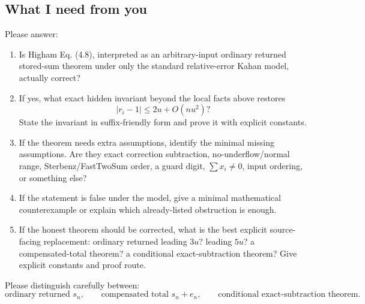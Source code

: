 \documentclass{article}
\begin{document}
\subsection*{What I need from you}

Please answer:

\begin{enumerate}
\item Is Higham Eq. (4.8), interpreted as an arbitrary-input ordinary returned
      stored-sum theorem under only the standard relative-error Kahan model,
      actually correct?
\item If yes, what exact hidden invariant beyond the local facts above restores
      \[
        |r_i-1|\le 2u+O(nu^2)?
      \]
      State the invariant in suffix-friendly form and prove it with explicit
      constants.
\item If the theorem needs extra assumptions, identify the minimal missing
      assumptions.  Are they exact correction subtraction, no-underflow/normal
      range, Sterbenz/FastTwoSum order, a guard digit, \(\sum x_i\neq0\), input
      ordering, or something else?
\item If the statement is false under the model, give a minimal mathematical
      counterexample or explain which already-listed obstruction is enough.
\item If the honest theorem should be corrected, what is the best explicit
      source-facing replacement: ordinary returned leading \(3u\)? leading
      \(5u\)? a compensated-total theorem? a conditional exact-subtraction
      theorem? Give explicit constants and proof route.
\end{enumerate}

Please distinguish carefully between:
\[
\text{ordinary returned }s_n,\qquad
\text{compensated total }s_n+e_n,\qquad
\text{conditional exact-subtraction theorem}.
\]
\end{document}
